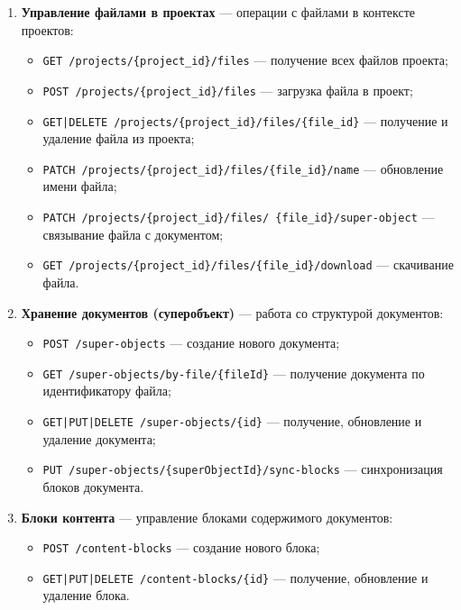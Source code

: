 \begin{enumerate}[wide=12.5mm, leftmargin=12.5mm]
    \item \textbf{Управление файлами в проектах} — операции с файлами в контексте проектов:
    \begin{itemize}[wide=12.5mm, leftmargin=12.5mm]
        \item \texttt{GET /projects/\{project\_id\}/files} — получение всех файлов проекта;
        \item \texttt{POST /projects/\{project\_id\}/files} — загрузка файла в проект;
        \item \texttt{GET|DELETE /projects/\{project\_id\}/files/\{file\_id\}} — получение и удаление файла из проекта;
        \item \texttt{PATCH /projects/\{project\_id\}/files/\{file\_id\}/name} — обновление имени файла;
        \item \texttt{PATCH /projects/\{project\_id\}/files/ \{file\_id\}/super-object} — связывание файла с документом;
        \item \texttt{GET /projects/\{project\_id\}/files/\{file\_id\}/download} — скачивание файла.
    \end{itemize}
    \pagebreak
    \item \textbf{Хранение документов (суперобъект)} — работа со структурой документов:
    \begin{itemize}[wide=12.5mm, leftmargin=12.5mm]
        \item \texttt{POST /super-objects} — создание нового документа;
        \item \texttt{GET /super-objects/by-file/\{fileId\}} — получение документа по идентификатору файла;
        \item \texttt{GET|PUT|DELETE /super-objects/\{id\}} — получение, обновление и удаление документа;
        \item \texttt{PUT /super-objects/\{superObjectId\}/sync-blocks} — синхронизация блоков документа.
    \end{itemize}

    \item \textbf{Блоки контента} — управление блоками содержимого документов:
    \begin{itemize}[wide=12.5mm, leftmargin=12.5mm]
        \item \texttt{POST /content-blocks} — создание нового блока;
        \item \texttt{GET|PUT|DELETE /content-blocks/\{id\}} — получение, обновление и удаление блока.
    \end{itemize}


\end{enumerate}
